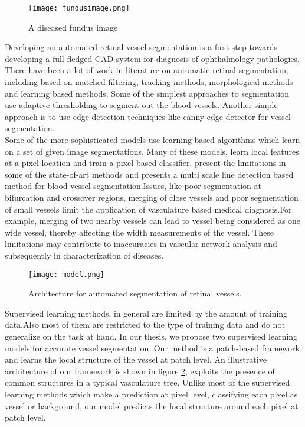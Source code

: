 \begin{figure}
	\centering	
	\texttt{[image: fundusimage.png]}
	\caption{A diseased fundus image}
	\label{fig:fundusdiseased}		
\end{figure}	

Developing an automated retinal vessel segmentation is a first step towards developing a full fledged CAD system for diagnosis of ophthalmology pathologies. There have been a lot of work in literature on automatic retinal segmentation, including based on matched filtering, tracking methods, morphological methods and learning based methods. Some of the simplest approaches to segmentation use adaptive thresholding to segment out the blood vessels. Another simple approach is to use edge detection techniques like canny edge detector for vessel segmentation.\\

Some of the more sophisticated models use learning based algorithms which learn on a set of given image segmentations. Many of these models, learn local features at a pixel location and train a pixel based classifier.\citep{nguyen2011effective} present the limitations in some of the state-of-art methods and presents a multi scale line detection based method for blood vessel segmentation.Issues, like poor segmentation at bifurcation and crossover regions, merging of close vessels and poor segmentation of small vessels limit the application of vasculature based medical diagnosis.For example, merging of two nearby vessels can lead to vessel being considered as one wide vessel, thereby affecting the width measurements of the vessel. These limitations may contribute to inaccuracies in vascular network analysis and subsequently in characterization of diseases. \\

\begin{figure}
	\centering	
	\texttt{[image: model.png]}
	\caption{Architecture for automated segmentation of retinal vessels.}
	\label{fig:basicmodel}		
\end{figure}
Supervised learning methods, in general are limited by the amount of training data.Also most of them are restricted to the type of training data and do not generalize on the task at hand. In our thesis, we propose two supervised learning models for accurate vessel segmentation. Our method is a patch-based framework and learns the local structure of the vessel at patch level. An illustrative architecture of our framework is shown in figure \ref{fig:basicmodel}, exploits the presence of common structures in a typical vasculature tree. Unlike most of the supervised learning methods which make a prediction at pixel level, classifying each pixel as vessel or background, our model predicts the local structure around each pixel at patch level.

